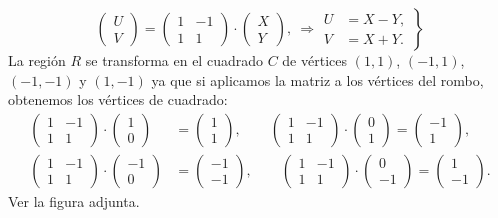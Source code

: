 \documentclass[]{book}
\begin{document}
\[
\begin{pmatrix}U\\ V\end{pmatrix}=\begin{pmatrix}1 & -1\\ 1& 1\end{pmatrix}\cdot\begin{pmatrix}X\\ Y\end{pmatrix},\ \Rightarrow \left.\begin{array}{rl}U & = X-Y,\\ V & =X+Y.\end{array}\right\}
\]
La región \(R\) se transforma en el cuadrado \(C\) de vértices \((1,1)\), \((-1,1)\), \((-1,-1)\) y \((1,-1)\) ya que si aplicamos la matriz a los vértices del rombo, obtenemos los vértices de cuadrado:
\[
\begin{array}{rl}
\begin{pmatrix}1 & -1\\ 1& 1\end{pmatrix}\cdot \begin{pmatrix}1\\ 0\end{pmatrix} & =\begin{pmatrix}1\\ 1\end{pmatrix},\qquad 
\begin{pmatrix}1 & -1\\ 1& 1\end{pmatrix}\cdot \begin{pmatrix}0\\ 1\end{pmatrix}=\begin{pmatrix}-1\\ 1\end{pmatrix},\\ 
\begin{pmatrix}1 & -1\\ 1& 1\end{pmatrix}\cdot \begin{pmatrix}-1\\ 0\end{pmatrix} & =\begin{pmatrix}-1\\ -1\end{pmatrix},\qquad 
\begin{pmatrix}1 & -1\\ 1& 1\end{pmatrix}\cdot \begin{pmatrix}0\\ -1\end{pmatrix}=\begin{pmatrix}1\\ -1\end{pmatrix}.
\end{array}
\]
Ver la figura adjunta.
\end{document}
